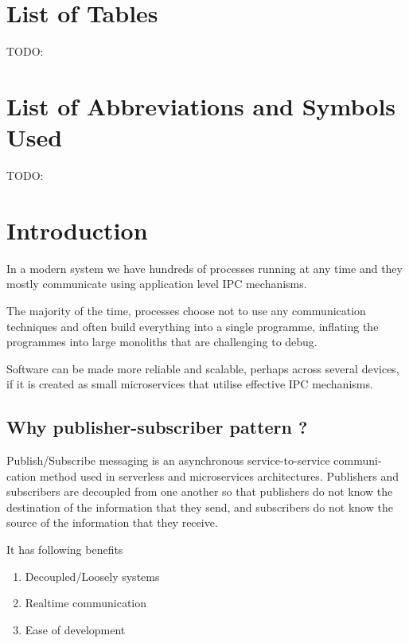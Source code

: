 \documentclass[12pt]{report}
\begin{document}
    \chapter*{List of Tables}
    TODO:
    
    \chapter*{List of Abbreviations and Symbols Used}
    TODO:
       
	\tableofcontents
	

	\chapter{Introduction}
	In a modern system we have hundreds of processes running at any time and they mostly 
	communicate using application level IPC mechanisms.
	
	The majority of the time, processes choose not to use any communication techniques 
	and often build everything into a single programme, inflating the programmes 
	into large monoliths that are challenging to debug.
	
	Software can be made more reliable and scalable, perhaps across several devices, 
	if it is created as small microservices that utilise effective IPC mechanisms.
	
	\section{Why publisher-subscriber pattern ?}
    Publish/Subscribe messaging is an asynchronous service-to-service communi-
    cation method used in serverless and microservices architectures. Publishers
    and subscribers are decoupled from one another so that publishers do not
    know the destination of the information that they send, and subscribers do
    not know the source of the information that they receive.

    It has following benefits
	\begin{enumerate}
		\item Decoupled/Loosely systems
		\item Real\-time communication
		\item Ease of development
	\end{enumerate}
	
\end{document}
